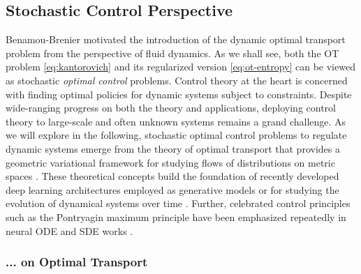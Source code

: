 \subsection{Stochastic Control Perspective} \label{sec:background_control}

Benamou-Brenier motivated the introduction of the dynamic optimal transport problem from the perspective of fluid dynamics.
As we shall see, both the OT problem \eqref{eq:kantorovich} and its regularized version \eqref{eq:ot-entropy} can be viewed as stochastic \textit{optimal control} problems.
Control theory at the heart is concerned with finding optimal policies for dynamic systems subject to constraints. Despite wide-ranging progress on both the theory and applications, deploying control theory to large-scale and often unknown systems remains a grand challenge.
As we will explore in the following, stochastic optimal control problems to regulate dynamic systems emerge from the theory of optimal transport \citep{santambrogio2015optimal} that provides a geometric variational framework for studying flows of distributions on metric spaces \citep{chen2021optimal}.
These theoretical concepts build the foundation of recently developed deep learning architectures employed as generative models \citep{song2020score, de2021diffusion} or for studying the evolution of dynamical systems over time \citep{chen2021likelihood, bunne2022proximal, vargas2021solving}.
Further, celebrated control principles such as the Pontryagin maximum principle have been emphasized repeatedly in neural \acrfull{ODE} \citep{chen2018neural} and \acrfull{SDE} works \citep{jia2019neural}.

\subsubsection*{... on Optimal Transport} \label{sec:background_control_ot}

